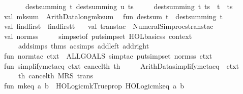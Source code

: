 \begin{isabellebody}
\ \ \ \ \ \ \ \ dest{\isacharunderscore}summing\ {\isacharparenleft}t{\isacharcomma}\ dest{\isacharunderscore}summing\ {\isacharparenleft}u{\isacharcomma}\ ts{\isacharparenright}{\isacharparenright}\isanewline
\ \ \ \ {\isacharbar}\ dest{\isacharunderscore}summing\ {\isacharparenleft}t{\isacharcomma}\ ts{\isacharparenright}\ {\isacharequal}\ t\ {\isacharcolon}{\isacharcolon}\ ts\isanewline
\isanewline
\ \ val\ mk{\isacharunderscore}sum\ {\isacharequal}\ Arith{\isacharunderscore}Data{\isachardot}long{\isacharunderscore}mk{\isacharunderscore}sum\isanewline
\ \ fun\ dest{\isacharunderscore}sum\ t\ {\isacharequal}\ dest{\isacharunderscore}summing\ {\isacharparenleft}t{\isacharcomma}\ {\isacharbrackleft}{\isacharbrackright}{\isacharparenright}\isanewline
\ \ val\ find{\isacharunderscore}first\ {\isacharequal}\ find{\isacharunderscore}first{\isacharunderscore}t\ {\isacharbrackleft}{\isacharbrackright}\isanewline
\ \ val\ trans{\isacharunderscore}tac\ {\isacharequal}\ Numeral{\isacharunderscore}Simprocs{\isachardot}trans{\isacharunderscore}tac\isanewline
\ \ val\ norm{\isacharunderscore}ss\ {\isacharequal}\isanewline
\ \ \ \ simpset{\isacharunderscore}of\ {\isacharparenleft}put{\isacharunderscore}simpset\ HOL{\isacharunderscore}basic{\isacharunderscore}ss\ {\isacharat}{\isacharbraceleft}context{\isacharbraceright}\isanewline
\ \ \ \ \ \ addsimps\ {\isacharat}{\isacharbraceleft}thms\ ac{\isacharunderscore}simps\ add{\isacharunderscore}{}{\isacharunderscore}left\ add{\isacharunderscore}{}{\isacharunderscore}right{\isacharbraceright}{\isacharparenright}\isanewline
\ \ fun\ norm{\isacharunderscore}tac\ ctxt\ {\isacharequal}\ ALLGOALS\ {\isacharparenleft}simp{\isacharunderscore}tac\ {\isacharparenleft}put{\isacharunderscore}simpset\ norm{\isacharunderscore}ss\ ctxt{\isacharparenright}{\isacharparenright}\isanewline
\ \ fun\ simplify{\isacharunderscore}meta{\isacharunderscore}eq\ ctxt\ cancel{\isacharunderscore}th\ th\ {\isacharequal}\isanewline
\ \ \ \ Arith{\isacharunderscore}Data{\isachardot}simplify{\isacharunderscore}meta{\isacharunderscore}eq\ {\isacharbrackleft}{\isacharbrackright}\ ctxt\isanewline
\ \ \ \ \ \ {\isacharparenleft}{\isacharbrackleft}th{\isacharcomma}\ cancel{\isacharunderscore}th{\isacharbrackright}\ MRS\ trans{\isacharparenright}\isanewline
\ \ fun\ mk{\isacharunderscore}eq\ {\isacharparenleft}a{\isacharcomma}\ b{\isacharparenright}\ {\isacharequal}\ HOLogic{\isachardot}mk{\isacharunderscore}Trueprop\ {\isacharparenleft}HOLogic{\isachardot}mk{\isacharunderscore}eq\ {\isacharparenleft}a{\isacharcomma}\ b{\isacharparenright}{\isacharparenright}\isanewline

\end{isabellebody}
